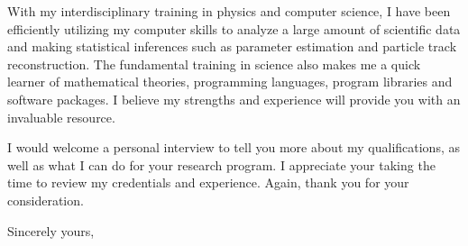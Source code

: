 \documentclass{letter} %
\begin{document}
\begin{letter}{}
With my interdisciplinary training in physics and computer science, I have been efficiently utilizing my computer skills to analyze a large amount of scientific data and making statistical inferences such as parameter estimation and particle track reconstruction. The fundamental training in science also makes me a quick learner of mathematical theories, programming languages, program libraries and software packages. I believe my strengths and experience will provide you with an invaluable resource.

\noindent %
I would welcome a personal interview to tell you more about my qualifications, as well as what I can do for your research program. I appreciate your taking the time to review my credentials and experience. Again, thank you for your consideration. 
 
\closing{Sincerely yours,} 
 

 

\end{letter}
 
\end{document}
